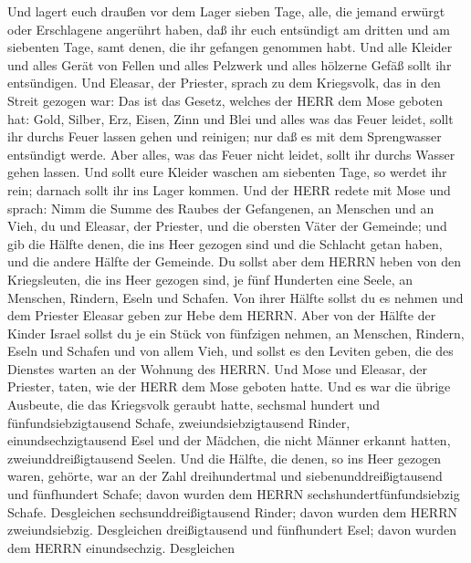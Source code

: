  Und lagert euch draußen vor dem Lager sieben Tage, alle,
die jemand erwürgt oder Erschlagene angerührt haben, daß ihr euch
entsündigt am dritten und am siebenten Tage, samt denen, die ihr
gefangen genommen habt.  Und alle Kleider und alles Gerät
von Fellen und alles Pelzwerk und alles hölzerne Gefäß sollt ihr
entsündigen.  Und Eleasar, der Priester, sprach zu dem
Kriegsvolk, das in den Streit gezogen war: Das ist das Gesetz, welches
der HERR dem Mose geboten hat:  Gold, Silber, Erz, Eisen,
Zinn und Blei  und alles was das Feuer leidet, sollt ihr
durchs Feuer lassen gehen und reinigen; nur daß es mit dem Sprengwasser
entsündigt werde. Aber alles, was das Feuer nicht leidet, sollt ihr
durchs Wasser gehen lassen.  Und sollt eure Kleider waschen
am siebenten Tage, so werdet ihr rein; darnach sollt ihr ins Lager
kommen.  Und der HERR redete mit Mose und sprach:
 Nimm die Summe des Raubes der Gefangenen, an Menschen und
an Vieh, du und Eleasar, der Priester, und die obersten Väter der
Gemeinde;  und gib die Hälfte denen, die ins Heer gezogen
sind und die Schlacht getan haben, und die andere Hälfte der Gemeinde.
 Du sollst aber dem HERRN heben von den Kriegsleuten, die
ins Heer gezogen sind, je fünf Hunderten eine Seele, an Menschen,
Rindern, Eseln und Schafen.  Von ihrer Hälfte sollst du es
nehmen und dem Priester Eleasar geben zur Hebe dem HERRN. 
Aber von der Hälfte der Kinder Israel sollst du je ein Stück von
fünfzigen nehmen, an Menschen, Rindern, Eseln und Schafen und von allem
Vieh, und sollst es den Leviten geben, die des Dienstes warten an der
Wohnung des HERRN.  Und Mose und Eleasar, der Priester,
taten, wie der HERR dem Mose geboten hatte.  Und es war die
übrige Ausbeute, die das Kriegsvolk geraubt hatte, sechsmal hundert und
fünfundsiebzigtausend Schafe,  zweiundsiebzigtausend
Rinder,  einundsechzigtausend Esel  und der
Mädchen, die nicht Männer erkannt hatten, zweiunddreißigtausend Seelen.
 Und die Hälfte, die denen, so ins Heer gezogen waren,
gehörte, war an der Zahl dreihundertmal und siebenunddreißigtausend und
fünfhundert Schafe;  davon wurden dem HERRN
sechshundertfünfundsiebzig Schafe.  Desgleichen
sechsunddreißigtausend Rinder; davon wurden dem HERRN zweiundsiebzig.
 Desgleichen dreißigtausend und fünfhundert Esel; davon
wurden dem HERRN einundsechzig.  Desgleichen
